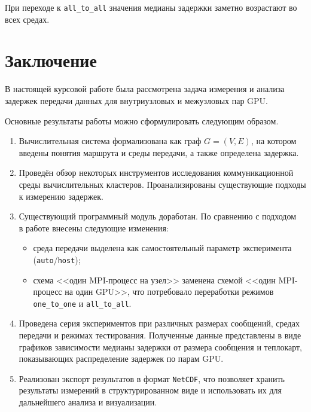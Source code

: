 \documentclass[a4paper,14pt]{extarticle}
\begin{document}
При переходе к \texttt{all\_to\_all} значения медианы задержки заметно возрастают во всех средах.

\newpage

\section*{Заключение}

В настоящей курсовой работе была рассмотрена задача измерения и анализа задержек передачи данных для внутриузловых и межузловых пар GPU. 

Основные результаты работы можно сформулировать следующим образом.

\begin{enumerate}[leftmargin=2.1cm, itemsep=0.25em, topsep=0.25em, parsep=0pt, partopsep=0pt]
	\item Вычислительная система формализована как граф \(G=(V,E)\), на котором введены понятия маршрута и среды передачи, а также определена задержка.
	
	\item Проведён обзор некоторых инструментов исследования коммуникационной среды вычислительных кластеров. Проанализированы существующие подходы к измерению задержек.
	
	\item Существующий программный модуль доработан. По сравнению с подходом~\cite{begaev} в работе внесены следующие изменения:
	\begin{itemize}[leftmargin=2.1cm, itemsep=0.15em, topsep=0.15em, parsep=0pt, partopsep=0pt]
		\item среда передачи выделена как самостоятельный параметр эксперимента (\texttt{auto}/\texttt{host});
		\item схема <<один MPI-процесс на узел>> заменена схемой <<один MPI-процесс на один GPU>>, что потребовало переработки режимов \texttt{one\_to\_one} и \texttt{all\_to\_all}.
	\end{itemize}
	
	\item Проведена серия экспериментов при различных размерах сообщений, средах передачи и режимах тестирования. Полученные данные представлены в виде графиков зависимости медианы задержки от размера сообщения и теплокарт, показывающих распределение задержек по парам GPU.
	
	\item Реализован экспорт результатов в формат \texttt{NetCDF}, что позволяет хранить результаты измерений в структурированном виде и использовать их для дальнейшего анализа и визуализации.
\end{enumerate}
\end{document}
